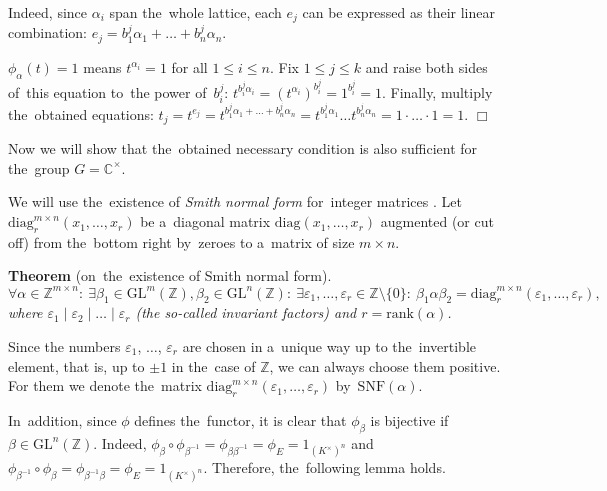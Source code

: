 \documentclass[twoside]{article}
\begin{document}
    Indeed, since $\alpha_i$ span the~whole lattice, each $e_j$ can be expressed as their linear combination:
    $
        e_j = b^j_1 \alpha_1 + \ldots + b^j_n \alpha_n.
    $

    $\phi_\alpha(t) = 1$ means $t^{\alpha_i} = 1$ for all $1 \leq i \leq n$.
    Fix $1 \leq j \leq k$ and raise both sides of~this equation to~the power of~$b^j_i$:
    $t^{b^j_i \alpha_i} = (t^{\alpha_i})^{b^j_i} = 1^{b^j_i} = 1$.
    Finally, multiply the~obtained equations:
    $
        t_j = t^{e_j} = t^{b^j_1 \alpha_1 + \ldots + b^j_n \alpha_n} = t^{b^j_1 \alpha_1} \ldots t^{b^j_n \alpha_n} = 1 \cdot \ldots \cdot 1 = 1.
    $
\hfill$\Box$\medskip

Now we will show that the~obtained necessary condition is also sufficient for the~group $G = {\mathbb{C}^\times}$.

We will use the~existence of \textit{Smith normal form} for~integer matrices \cite{Smth60}.
Let $\mathrm{diag}^{m \times n}_r(x_1,\allowbreak \ldots,\allowbreak x_r)$ be a~diagonal matrix $\mathrm{diag}(x_1,\allowbreak \ldots,\allowbreak x_r)$
augmented (or cut off) from the~bottom right by~zeroes to a~matrix of size $m \times n$.

\medskip\noindent\textbf{Theorem} (on~the~existence of Smith normal form).\emph{
    $$
        \forall \alpha \in \mathbb{Z}^{m \times n}{:}\
        \exists \beta_1 \in \mathrm{GL}^m(\mathbb{Z}), \beta_2 \in \mathrm{GL}^n(\mathbb{Z}){:} \
        \exists \varepsilon_1, \ldots, \varepsilon_r \in \mathbb{Z} \setminus \{0\}{:} \
        \beta_1 \alpha \beta_2 = \mathrm{diag}^{m \times n}_r(\varepsilon_1, \ldots, \varepsilon_r),
    $$
    where $\varepsilon_1 \mid \varepsilon_2 \mid \ldots \mid \varepsilon_r$ (the so-called invariant factors) and $r = \mathrm{rank}(\alpha)$.
}\medskip

Since the numbers $\varepsilon_1$, $\ldots$, $\varepsilon_r$ are chosen in a~unique way up to the~invertible element,
that is, up to $\pm 1$ in the~case of $\mathbb{Z}$, we can always choose them positive. For them we denote
the~matrix $\mathrm{diag}^{m \times n}_r(\varepsilon_1, \ldots, \varepsilon_r)$ by~$\mathrm{SNF}(\alpha)$.

In~addition, since $\phi$ defines the~functor, it is clear that $\phi_\beta$ is bijective if $\beta \in \mathrm{GL}^n(\mathbb{Z})$.
Indeed, $\phi_\beta \circ \phi_{\beta^{-1}} = \phi_{\beta \beta^{-1}} = \phi_E = 1_{(K^\times)^n}$
and $\phi_{\beta^{-1}} \circ \phi_\beta = \phi_{\beta^{-1} \beta} = \phi_E = 1_{(K^\times)^n}$. Therefore,
the~following lemma holds.
\end{document}
